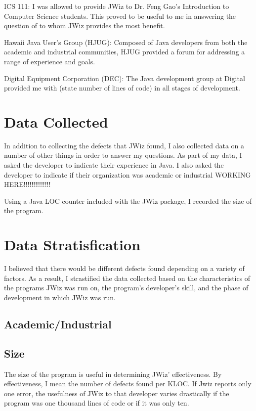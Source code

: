 ICS 111: I was allowed to provide JWiz to Dr. Feng Gao's Introduction to
Computer Science students.  This proved to be useful to me in answering the
question of to whom JWiz provides the most benefit.

Hawaii Java User's Group (HJUG): Composed of Java developers from both the
academic and industrial communities, HJUG provided a forum for addressing a
range of experience and goals.

Digital Equipment Corporation (DEC): The Java development group at Digital
provided me with (state number of lines of code) in all stages of
development.


\section{Data Collected}
In addition to collecting the defects that JWiz found, I also collected
data on a number of other things in order to answer my questions.  As part
of my data, I asked the developer to indicate their experience in Java.
I also asked the developer to indicate if their organization was academic
or industrial  WORKING HERE!!!!!!!!!!!!!! 

Using a Java LOC counter included with the JWiz package, I recorded the
size of the program. 





\section{Data Stratisfication}
I believed that there would be different defects found depending on a
variety of factors.  As a result, I strastified the data collected based on
the characteristics of the programs JWiz was run on, the program's
developer's skill, and the phase of development in which JWiz was run.

\subsection{Academic/Industrial}
\subsection{Size}
The size of the program is useful in determining JWiz' effectiveness.  By
effectiveness, I mean the number of defects found per KLOC.  If Jwiz
reports only one error, the usefulness of JWiz to that developer varies
drastically if the program was one thousand lines of code or if it was only
ten.

